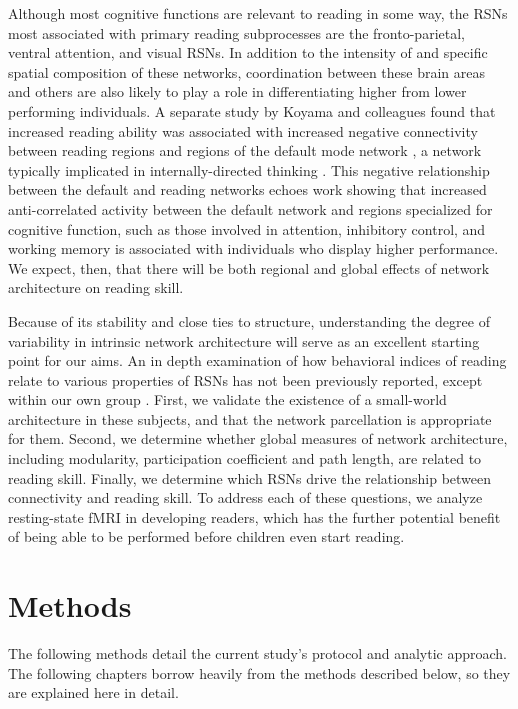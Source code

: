 Although most cognitive functions are relevant to reading in some way, the RSNs most associated with primary reading subprocesses are the fronto-parietal, ventral attention, and visual RSNs. In addition to the intensity of and specific spatial composition of these networks, coordination between these brain areas and others are also likely to play a role in differentiating higher from lower performing individuals. A separate study by Koyama and colleagues found that increased reading ability was associated with increased negative connectivity between reading regions and regions of the default mode network \citep{Koyama2013}, a network typically implicated in internally-directed thinking \citep{Andrews-Hanna2014}. This negative relationship between the default and reading networks echoes work showing that increased anti-correlated activity between the default network and regions specialized for cognitive function, such as those involved in attention, inhibitory control, and working memory is associated with individuals who display higher performance. We expect, then, that there will be both regional and global effects of network architecture on reading skill.

Because of its stability and close ties to structure, understanding the degree of variability in intrinsic network architecture will serve as an excellent starting point for our aims. An in depth examination of how behavioral indices of reading relate to various properties of RSNs has not been previously reported, except within our own group \citep{Bailey2018}. First, we validate the existence of a small-world architecture in these subjects, and that the network parcellation is appropriate for them. Second, we determine whether global measures of network architecture, including modularity, participation coefficient and path length, are related to reading skill. Finally, we determine which RSNs drive the relationship between connectivity and reading skill. To address each of these questions, we analyze resting-state fMRI in developing readers, which has the further potential benefit of being able to be performed before children even start reading.


\section{Methods}

The following methods detail the current study's protocol and analytic approach. The following chapters borrow heavily from the methods described below, so they are explained here in detail. 

